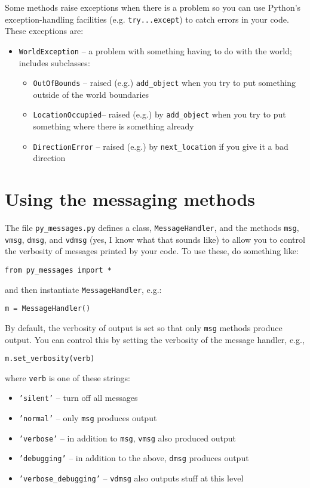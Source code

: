 \documentclass[11pt]{tufte-handout}
\begin{document}
Some methods raise exceptions when there is a problem so you can use Python's exception-handling facilities (e.g. \texttt{try...except}) to catch errors in your code.  These exceptions are:
\begin{itemize}
\item \texttt{WorldException} -- a problem with something having to do with the world; includes subclasses:
\begin{itemize}
\item \texttt{OutOfBounds} -- raised (e.g.) \texttt{add\_object} when you try to put something outside of the world boundaries
\item \texttt{LocationOccupied}-- raised (e.g.) by \texttt{add\_object} when you try to put something where there is something already
\item \texttt{DirectionError} -- raised (e.g.) by \texttt{next\_location} if you give it a bad direction
\end{itemize}
\end{itemize}

\section{Using the messaging methods}
\label{sec:org2a50c34}

The file \texttt{py\_messages.py} defines a class, \texttt{MessageHandler}, and the methods \texttt{msg}, \texttt{vmsg}, \texttt{dmsg}, and \texttt{vdmsg} (yes, I know what that sounds like) to allow you to control the verbosity of messages printed by your code.  To use these, do something like:
\begin{verbatim}
from py_messages import *
\end{verbatim}

and then  instantiate \texttt{MessageHandler}, e.g.:
\begin{verbatim}
m = MessageHandler()
\end{verbatim}


By default, the verbosity of output is set so that only \texttt{msg} methods produce output.  You can control this by setting the verbosity of the message handler, e.g.,
\begin{verbatim}
m.set_verbosity(verb)
\end{verbatim}

\noindent where \texttt{verb} is one of these strings:
\begin{itemize}
\item \texttt{'silent'} -- turn off all messages
\item \texttt{'normal'} -- only \texttt{msg} produces output
\item \texttt{'verbose'}  -- in addition to \texttt{msg}, \texttt{vmsg} also produced output
\item \texttt{'debugging'} -- in addition to the above, \texttt{dmsg} produces output
\item \texttt{'verbose\_debugging'} -- \texttt{vdmsg} also outputs stuff at this level
\end{itemize}
\end{document}
